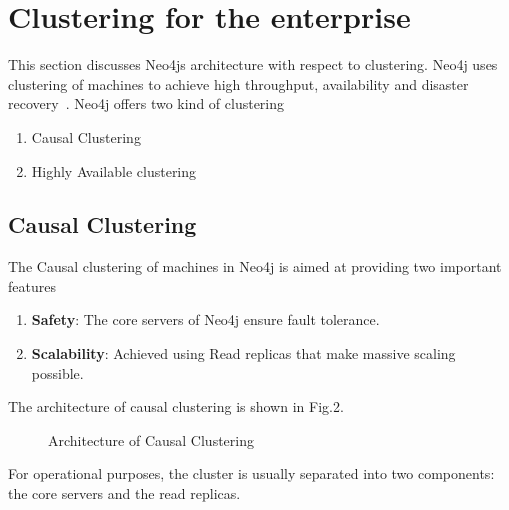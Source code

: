 \documentclass[9pt,twocolumn,twoside]{../../styles/osajnl}
\begin{document}
\section{Clustering for the enterprise}
This section discusses Neo4js architecture with respect to clustering. Neo4j uses clustering of machines to achieve high throughput, availability and disaster recovery~\cite{www-neo4j}. Neo4j offers two kind of clustering 
\begin{enumerate}
    \item Causal Clustering
    \item Highly Available clustering
\end{enumerate}

\subsection{Causal Clustering}
The Causal clustering of machines in Neo4j is aimed at providing two important features~\cite{www-neo4j-causal}
\begin{enumerate}
    \item \textbf{Safety}: The core servers of Neo4j ensure fault tolerance.
    \item \textbf{Scalability}: Achieved using Read replicas that make massive scaling possible.
\end{enumerate}
The architecture of causal clustering is shown in Fig.2.
\begin{figure}[htbp]
\centering
{}
\caption{Architecture of Causal Clustering ~\cite{www-neo4j-causal}}
\label{fig:false-color}
\end{figure}

For operational purposes, the cluster is usually separated into two components: the core servers and the read replicas. 
\end{document}
